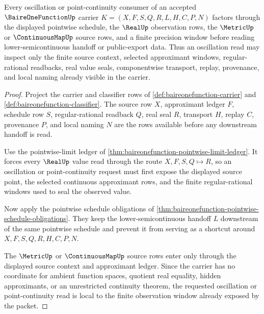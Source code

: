 \begin{theorem}
\label{thm:baireonefunction-oscillation-locality}
Every oscillation or point-continuity consumer of an accepted $\BaireOneFunctionUp$ carrier $K=(X,F,S,Q,R,L,H,C,P,N)$ factors through the displayed pointwise schedule, the $\RealUp$ observation rows, the $\MetricUp$ or $\ContinuousMapUp$ source rows, and a finite precision window before reading lower-semicontinuous handoff or public-export data. Thus an oscillation read may inspect only the finite source context, selected approximant windows, regular-rational readbacks, real value seals, componentwise transport, replay, provenance, and local naming already visible in the carrier.
\end{theorem}
\begin{proof}
Project the carrier and classifier rows of \autoref{def:baireonefunction-carrier} and \autoref{def:baireonefunction-classifier}. The source row $X$, approximant ledger $F$, schedule row $S$, regular-rational readback $Q$, real seal $R$, transport $H$, replay $C$, provenance $P$, and local naming $N$ are the rows available before any downstream handoff is read.

Use the pointwise-limit ledger of \autoref{thm:baireonefunction-pointwise-limit-ledger}. It forces every $\RealUp$ value read through the route $X,F,S,Q\longmapsto R$, so an oscillation or point-continuity request must first expose the displayed source point, the selected continuous approximant rows, and the finite regular-rational windows used to seal the observed value.

Now apply the pointwise schedule obligations of \autoref{thm:baireonefunction-pointwise-schedule-obligations}. They keep the lower-semicontinuous handoff $L$ downstream of the same pointwise schedule and prevent it from serving as a shortcut around $X,F,S,Q,R,H,C,P,N$.

The $\MetricUp$ or $\ContinuousMapUp$ source rows enter only through the displayed source context and approximant ledger. Since the carrier has no coordinate for ambient function spaces, quotient real equality, hidden approximants, or an unrestricted continuity theorem, the requested oscillation or point-continuity read is local to the finite observation window already exposed by the packet.
\end{proof}

